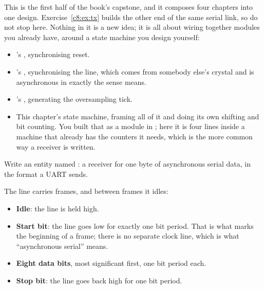 
\label{c8:ex:rx}
This is the first half of the book's capstone, and it composes four chapters into one design.
Exercise~\ref{c8:ex:tx} builds the other end of the same serial link, so do not stop here. Nothing in
it is a new idea; it is all about wiring together modules you already have, around a state machine
you design yourself:
\begin{itemize}
  \item {}'s , synchronising reset.
  \item {}'s , synchronising the  line, which comes from somebody
    else's crystal and is asynchronous in exactly the sense  means.
  \item {}'s , generating the oversampling tick.
  \item This chapter's state machine, framing all of it and doing its own shifting and bit counting.
    You built that as a module in ; here it is four lines inside a machine that
    already has the counters it needs, which is the more common way a receiver is written.
\end{itemize}

Write an entity named : a receiver for one byte of asynchronous serial data, in the
format a UART sends.

The  line carries frames, and between frames it idles:
\begin{itemize}
  \item \textbf{Idle}: the line is held high.
  \item \textbf{Start bit}: the line goes low for exactly one bit period. That is what marks the
    beginning of a frame; there is no separate clock line, which is what ``asynchronous serial''
    means.
  \item \textbf{Eight data bits}, most significant first, one bit period each.
  \item \textbf{Stop bit}: the line goes back high for one bit period.
\end{itemize}


